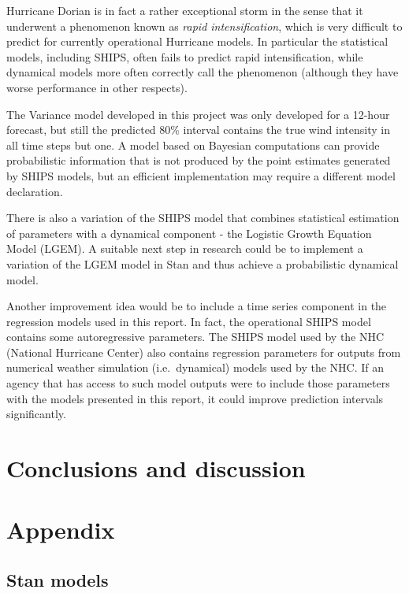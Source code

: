 \documentclass[
]{article}
\begin{document}
Hurricane Dorian is in fact a rather exceptional storm in the sense that
it underwent a phenomenon known as \emph{rapid intensification}, which
is very difficult to predict for currently operational Hurricane models.
In particular the statistical models, including SHIPS, often fails to
predict rapid intensification, while dynamical models more often
correctly call the phenomenon (although they have worse performance in
other respects).

The Variance model developed in this project was only developed for a
12-hour forecast, but still the predicted 80\% interval contains the
true wind intensity in all time steps but one. A model based on Bayesian
computations can provide probabilistic information that is not produced
by the point estimates generated by SHIPS models, but an efficient
implementation may require a different model declaration.

There is also a variation of the SHIPS model that combines statistical
estimation of parameters with a dynamical component - the Logistic
Growth Equation Model (LGEM). A suitable next step in research could be
to implement a variation of the LGEM model in Stan and thus achieve a
probabilistic dynamical model.

Another improvement idea would be to include a time series component in
the regression models used in this report. In fact, the operational
SHIPS model contains some autoregressive parameters. The SHIPS model
used by the NHC (National Hurricane Center) also contains regression
parameters for outputs from numerical weather simulation
(i.e.~dynamical) models used by the NHC. If an agency that has access to
such model outputs were to include those parameters with the models
presented in this report, it could improve prediction intervals
significantly.

\newpage

\hypertarget{conclusions-and-discussion}{%
\section{Conclusions and discussion}\label{conclusions-and-discussion}}

\newpage

\hypertarget{appendix}{%
\section{Appendix}\label{appendix}}

\hypertarget{stan-models}{%
\subsection{Stan models}\label{stan-models}}
\end{document}
